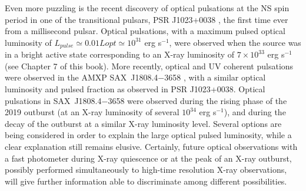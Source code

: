 \documentclass[graybox]{svmult}
\def \saxj{{\rm SAX~J1808.4$-$3658\xspace}}
\begin{document}
Even more puzzling is the recent discovery of optical pulsations at the NS spin period in one of the transitional pulsars, PSR J1023+0038 \cite{Ambrosino2017,Papitto2019}, the first time ever from a millisecond pulsar. Optical pulsations, with a maximum pulsed optical luminosity of $L_{pulse} \simeq 0.01 L{opt} \simeq 10^{31}$ erg s$^{-1}$, were observed when the source was in a bright active state corresponding to an X-ray luminosity of $7\times 10^{33}$ erg s$^{-1}$ (see Chapter 7 of this book). More recently, optical and UV coherent pulsations were observed in the AMXP \saxj{} \cite{Ambrosino2020}, with a similar optical luminosity and pulsed fraction as observed in PSR J1023+0038. Optical pulsations in \saxj{} were observed during the rising phase of the 2019 outburst (at an X-ray luminosity of several $10^{34}$ erg s$^{-1}$), and during the decay of the outburst at a similar X-ray luminosity level. Several options are being considered in order to explain the large optical pulsed luminosity, while a clear explanation still remains elusive. Certainly, future optical observations with a fast photometer during X-ray quiescence or at the peak of an X-ray outburst, possibly performed simultaneously to high-time resolution X-ray observations, will give further information able to discriminate among different possibilities.
\end{document}
